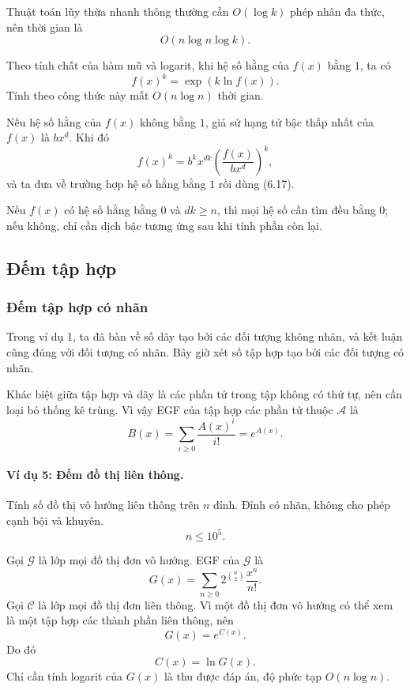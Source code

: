 \documentclass[11pt]{article}
\begin{document}
Thuật toán lũy thừa nhanh thông thường cần \(O(\log k)\) phép nhân đa thức, nên
thời gian là
\[
  O(n\log n\log k).
\]

Theo tính chất của hàm mũ và logarit, khi hệ số hằng của \(f(x)\) bằng \(1\),
ta có
\[
  f(x)^k=\exp(k\ln f(x)). \tag{6.17}
\]
Tính theo công thức này mất \(O(n\log n)\) thời gian.

Nếu hệ số hằng của \(f(x)\) không bằng \(1\), giả sử hạng tử bậc thấp nhất của
\(f(x)\) là \(b x^d\). Khi đó
\[
  f(x)^k=b^k x^{dk}\left(\frac{f(x)}{b x^d}\right)^k,
\]
và ta đưa về trường hợp hệ số hằng bằng \(1\) rồi dùng (6.17).

Nếu \(f(x)\) có hệ số hằng bằng \(0\) và \(dk\ge n\), thì mọi hệ số cần tìm đều
bằng \(0\); nếu không, chỉ cần dịch bậc tương ứng sau khi tính phần còn lại.

\subsection{Đếm tập hợp}

\subsubsection{Đếm tập hợp có nhãn}

Trong ví dụ 1, ta đã bàn về số dãy tạo bởi các đối tượng không nhãn, và kết
luận cũng đúng với đối tượng có nhãn. Bây giờ xét số tập hợp tạo bởi các đối
tượng có nhãn.

Khác biệt giữa tập hợp và dãy là các phần tử trong tập không có thứ tự, nên cần
loại bỏ thống kê trùng. Vì vậy EGF của tập hợp các phần tử thuộc \(\mathcal A\)
là
\[
  B(x)=\sum_{i\ge 0}\frac{A(x)^i}{i!}=e^{A(x)}. \tag{7.1}
\]

\paragraph{Ví dụ 5: Đếm đồ thị liên thông.}
Tính số đồ thị vô hướng liên thông trên \(n\) đỉnh. Đỉnh có nhãn, không cho
phép cạnh bội và khuyên.
\[
  n\le 10^5.
\]

Gọi \(\mathcal G\) là lớp mọi đồ thị đơn vô hướng. EGF của \(\mathcal G\) là
\[
  G(x)=\sum_{n\ge 0}2^{\binom n2}\frac{x^n}{n!}. \tag{7.2}
\]
Gọi \(\mathcal C\) là lớp mọi đồ thị đơn liên thông. Vì một đồ thị đơn vô hướng
có thể xem là một tập hợp các thành phần liên thông, nên
\[
  G(x)=e^{C(x)}.
\]
Do đó
\[
  C(x)=\ln G(x). \tag{7.3}
\]
Chỉ cần tính logarit của \(G(x)\) là thu được đáp án, độ phức tạp \(O(n\log n)\).
\end{document}
